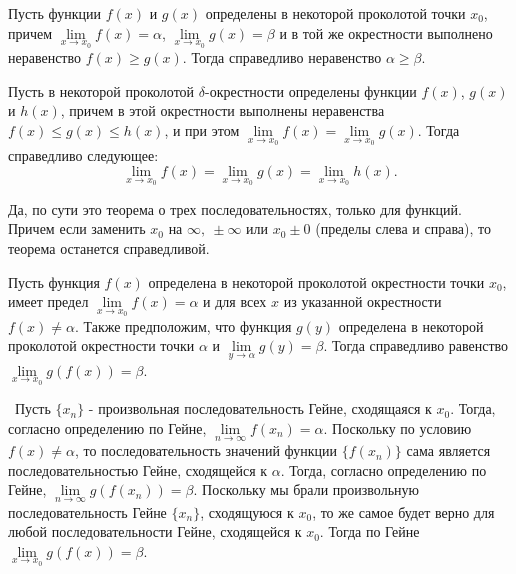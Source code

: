 \begin{corollary}
Пусть функции \(f(x)\) и \(g(x)\) определены в некоторой проколотой
 точки \(x_{0}\), причем
\(\lim\limits_{x\to x_{0}} f(x) = \alpha\),
\(\lim\limits_{x\to x_{0}} g(x) = \beta\) и в той же окрестности выполнено неравенство
\(f(x) \geq g(x)\). Тогда справедливо неравенство \(\alpha \geq \beta\).
\end{corollary}

\begin{theorem}
Пусть в некоторой проколотой \(\delta\)-окрестности определены функции \(f(x)\), \(g(x)\)
и \(h(x)\), причем в этой окрестности выполнены неравенства \(f(x) \leq g(x) \leq h(x)\),
и при этом \(\lim\limits_{x \to x_{0}} f(x) = \lim\limits_{x \to x_{0}} g(x)\).
Тогда справедливо следующее:
\[
\lim_{ x \to x_{0} }f(x) = \lim_{ x \to x_{0} } g(x) = \lim_{ x \to x_{0} }h(x).
\]
\end{theorem}

\begin{note}
Да, по сути это теорема о трех последовательностях, только для функций.
Причем если заменить \(x_{0}\) на \(\infty, ~ \pm \infty\) или \(x_{0} \pm 0\)
(пределы слева и справа), то теорема останется справедливой.
\end{note}


\begin{theorem}
Пусть функция \(f(x)\) определена в некоторой проколотой окрестности точки \(x_{0}\),
имеет предел \(\lim\limits_{x \to x_{0}} f(x) = \alpha\) и для всех \(x\) из указанной окрестности
\(f(x) \neq \alpha\). Также предположим, что функция \(g(y)\) определена в некоторой проколотой
окрестности точки \(\alpha\) и \(\lim\limits_{y \to \alpha} g(y) = \beta\).
Тогда справедливо равенство \(\lim\limits_{x \to x_{0}} g(f(x)) = \beta\).

\vspace{3mm}

\proofname~Пусть \(\{x_{n}\}\) - произвольная последовательность Гейне, сходящаяся к \(x_{0}\).
Тогда, согласно определению по Гейне, \(\lim\limits_{n \to \infty} f(x_{n}) = \alpha\).
Поскольку по условию \(f(x) \neq \alpha\), то последовательность значений функции
\(\{f(x_{n})\}\) сама является последовательностью Гейне, сходящейся к \(\alpha\).
Тогда, согласно определению по Гейне, \(\lim\limits_{n \to \infty} g(f(x_{n})) = \beta\).
Поскольку мы брали произвольную последовательность Гейне \(\{x_{n}\}\), сходящуюся к \(x_{0}\),
то же самое будет верно для любой последовательности Гейне, сходящейся к \(x_{0}\).
Тогда по Гейне \(\lim\limits_{x \to x_{0}} g(f(x)) = \beta\).~\qedsymbol
\end{theorem}

